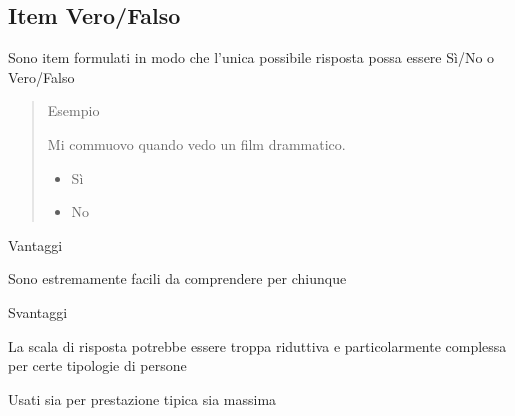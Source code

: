 \documentclass[compress]{beamer}
\begin{document}
\subsection*{Item Vero/Falso}
\begin{frame}
	Sono item formulati in modo che l'unica possibile risposta possa essere Sì/No o Vero/Falso 
	
	\begin{quote}{Esempio}
		
		Mi commuovo quando vedo un film drammatico.
		\begin{itemize}
			\item Sì
			\item No
		\end{itemize}
	\end{quote}
	
	\pause
	
	\begin{block}{Vantaggi}
		
		Sono estremamente facili da comprendere per chiunque 
	\end{block}
	
	\begin{block}{Svantaggi}
		
		La scala di risposta potrebbe essere troppa riduttiva e particolarmente complessa per certe tipologie di persone
	\end{block}
	
	Usati sia per prestazione tipica sia massima
\end{frame}
\end{document}
